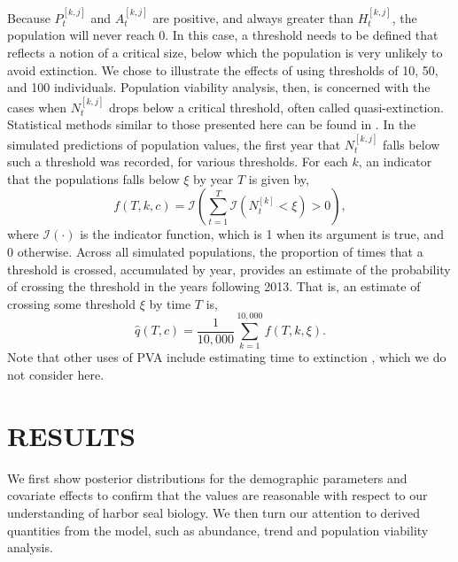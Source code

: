 \documentclass[]{risa}\usepackage[]{graphicx}\usepackage[]{color}
\begin{document}
Because $P_t^{[k,j]}$ and $A_t^{[k,j]}$ are positive, and always greater than $ H_t^{[k,j]}$, the population will never reach 0.  In this case, a threshold needs to be defined that reflects a notion of a critical size, below which the population is very unlikely to avoid extinction.  We chose to illustrate the effects of using thresholds of 10, 50, and 100 individuals. Population viability analysis, then, is concerned with the cases when $N^{[k,j]}_t$ drops below a critical threshold, often called quasi-extinction.  Statistical methods similar to those presented here can be found in \citet{Holm:Sabo:Visc:Vinc:Faga:stat:2007}. In the simulated predictions of population values, the first year that $N^{[k,j]}_t$ falls below such a threshold was recorded, for various thresholds. For each $k$, an indicator that the populations falls below $\xi$ by year $T$ is given by, 
\[
f(T,k,c) = \mathcal{I}\left(\sum_{t=1}^T\mathcal{I}(N^{[k]}_t < \xi) > 0\right),
\]
where $\mathcal{I}(\cdot)$ is the indicator function, which is 1 when its argument is true, and 0 otherwise. Across all simulated populations, the proportion of times that a threshold is crossed, accumulated by year, provides an estimate of the probability of crossing the threshold in the years following 2013.  That is, an estimate of crossing some threshold $\xi$ by time $T$ is,
\begin{equation} \label{eq:probThresh}
  \hat{q}(T,c) = \frac{1}{10,000} \sum_{k=1}^{10,000} f(T,k,\xi).
\end{equation}
Note that other uses of PVA include estimating time to extinction \citep{Tayl:reli:1995}, which we do not consider here.


\section{RESULTS}


We first show posterior distributions for the demographic parameters and covariate effects to confirm that the values are reasonable with respect to our understanding of harbor seal biology. We then turn our attention to derived quantities from the model, such as abundance, trend and population viability analysis.
\end{document}
